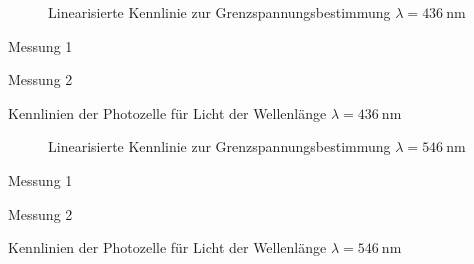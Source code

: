 \begin{figure}
	\centering
	
	\caption{Linearisierte Kennlinie zur Grenzspannungsbestimmung $\lambda = \SI{436}{\nano\metre}$}
	\label{fig:kennlinien_436nm}
\end{figure}
\begin{table}
	\centering
	\begin{subtable}{0.5\textwidth}
		\centering
		\vspace{0pt}
		\resizebox{0.95\columnwidth}{!}{%
			
		}
		\caption{Messung 1}
	\end{subtable}%
	\begin{subtable}{0.5\textwidth}
		\centering
		\vspace{0pt}
		\resizebox{0.95\columnwidth}{!}{%
			
		}
		\caption{Messung 2}
	\end{subtable}

	\caption{Kennlinien der Photozelle f\"ur Licht der Wellenl\"ange $\lambda = \SI{436}{\nano\metre}$}
\end{table}
\clearpage


\begin{figure}
	\centering
	
	\caption{Linearisierte Kennlinie zur Grenzspannungsbestimmung $\lambda = \SI{546}{\nano\metre}$}
	\label{fig:kennlinien_546nm}
\end{figure}
\begin{table}
	\centering
	\begin{subtable}{0.5\textwidth}
		\centering
		\vspace{0pt}
		\resizebox{0.95\columnwidth}{!}{%
			
		}
		\caption{Messung 1}
	\end{subtable}%
	\begin{subtable}{0.5\textwidth}
		\centering
		\vspace{0pt}
		\resizebox{0.95\columnwidth}{!}{%
			
		}
		\caption{Messung 2}
	\end{subtable}

	\caption{Kennlinien der Photozelle f\"ur Licht der Wellenl\"ange $\lambda = \SI{546}{\nano\metre}$}
\end{table}
\clearpage


